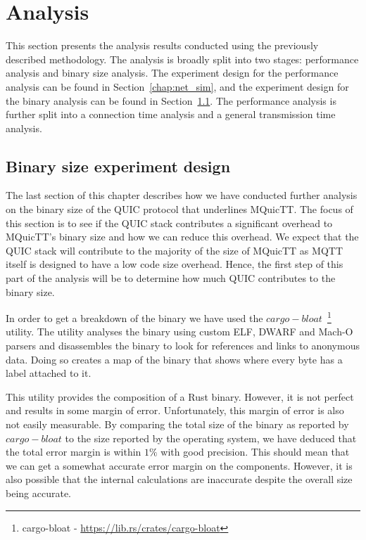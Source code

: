 \chapter{Analysis} \label{chapter:eval}

This section presents the analysis results conducted using the previously described methodology.
The analysis is broadly split into two stages: performance analysis and binary size analysis.
The experiment design for the performance analysis can be found in Section~\ref{chap:net_sim}, and the experiment design for the binary analysis can be found in Section~\ref{sec:exp_bin}.
The performance analysis is further split into a connection time analysis and a general transmission time analysis.





\section{Binary size experiment design} \label{sec:exp_bin}

The last section of this chapter describes how we have conducted further analysis on the binary size of the QUIC protocol that underlines MQuicTT.
The focus of this section is to see if the QUIC stack contributes a significant overhead to MQuicTT's binary size and how we can reduce this overhead.
We expect that the QUIC stack will contribute to the majority of the size of MQuicTT as MQTT itself is designed to have a low code size overhead.
Hence, the first step of this part of the analysis will be to determine how much QUIC contributes to the binary size.

In order to get a breakdown of the binary we have used the $cargo-bloat$~\footnote{cargo-bloat - \url{https://lib.rs/crates/cargo-bloat}} utility.
The utility analyses the binary using custom ELF, DWARF and Mach-O parsers and disassembles the binary to look for references and links to anonymous data.
Doing so creates a map of the binary that shows where every byte has a label attached to it.

This utility provides the composition of a Rust binary. 
However, it is not perfect and results in some margin of error.
Unfortunately, this margin of error is also not easily measurable.
By comparing the total size of the binary as reported by $cargo-bloat$ to the size reported by the operating system, we have deduced that the total error margin is within $1\%$ with good precision.
This should mean that we can get a somewhat accurate error margin on the components. 
However, it is also possible that the internal calculations are inaccurate despite the overall size being accurate.

